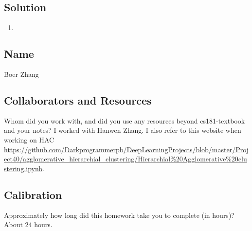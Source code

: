 \documentclass[submit]{harvardml}
\begin{document}
\newpage
\subsection*{Solution}
\begin{enumerate}
    \item 
\end{enumerate}
\newpage
\subsection*{Name}
Boer Zhang
\subsection*{Collaborators and Resources}
Whom did you work with, and did you use any resources beyond cs181-textbook and your notes?
I worked with Hanwen Zhang. I also refer to this website when working on HAC \url{https://github.com/Darkprogrammerpb/DeepLearningProjects/blob/master/Project40/agglomerative_hierarchial_clustering/Hierarchial\%20Agglomerative\%20clustering.ipynb}.
\subsection*{Calibration}
Approximately how long did this homework take you to complete (in hours)? 
About 24 hours.
\end{document}
